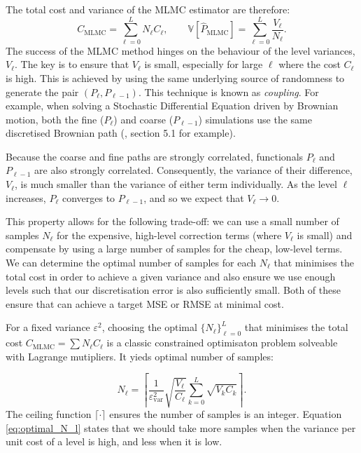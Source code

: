 The total cost and variance of the MLMC estimator are therefore:
$$
C_{\mathrm{MLMC}} = \sum_{\ell=0}^L N_\ell C_\ell, \qquad 
\mathbb{V}[\hat{P}_{\mathrm{MLMC}}] = \sum_{\ell=0}^L \frac{V_\ell}{N_\ell}.
$$
The success of the MLMC method hinges on the behaviour of the level variances, 
$V_\ell$. The key is to ensure that $V_\ell$ is small, especially for large $\ell$ where
the cost $C_\ell$ is high. This is achieved by using the same underlying source of 
randomness to generate the pair $(P_\ell, P_{\ell-1})$. This technique is known as
\textit{coupling}. For example, when solving a Stochastic Differential Equation 
driven by Brownian motion,
both the fine ($P_\ell$) and coarse ($P_{\ell - 1}$) simulations use the same discretised Brownian path 
(\cite{giles2015multilevel}, section 5.1 for example). 

Because the coarse and fine paths are strongly correlated, 
functionals $P_\ell$ and $P_{\ell-1}$ are also strongly correlated. 
Consequently, the variance of their difference, $V_\ell$, is much smaller 
than the variance of either term individually. As the level $\ell$ increases, 
$P_\ell$ converges to $P_{\ell-1}$, and so we expect that $V_\ell \to 0$.

This property allows for the following trade-off: we can use a small number of samples $N_\ell$ 
for the expensive, high-level correction terms (where $V_\ell$ is small) and compensate 
by using a large number of samples for the cheap, low-level terms. We can determine the 
optimal number of samples for each $N_\ell$ that minimises the total cost in order 
to achieve a given variance and also ensure we use enough levels such that our discretisation error 
is also sufficiently small. Both of these ensure that can achieve a target MSE or RMSE at minimal cost.

For a fixed variance $\varepsilon^2$, choosing the optimal $\{N_\ell\}_{\ell=0}^L$ that 
minimises the total cost $C_{\textrm{MLMC}} = \sum N_\ell C_\ell$ is a classic 
constrained optimisaton problem solveable with Lagrange mutipliers. It yieds 
optimal number of samples:

\begin{equation}\label{eq:optimal_N_l}
    N_\ell = \left\lceil \frac{1}{\varepsilon_{\text{var}}^2} \sqrt{\frac{V_\ell}{C_\ell}} \sum_{k=0}^L \sqrt{V_k C_k} \right\rceil.
\end{equation}
The ceiling function $\lceil \cdot \rceil$ ensures the number of samples is an integer.
Equation \eqref{eq:optimal_N_l} states that we should take more samples when the 
variance per unit cost of a level is high, and less when it is low.


